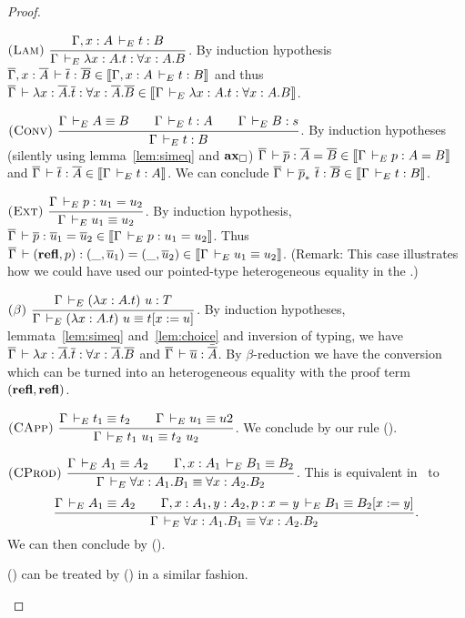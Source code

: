 \documentclass[11pt]{article}
\theoremstyle{plain}
\theoremstyle{remark}
\begin{document}
\begin{proof}
\begin{caselist}
    \nextcase \(
      \nmru{Lam%
          }{\Gamma, x:A \dere t : B
          }{\Gamma \dere \lambda x:A.t : \forall x:A.B}
    \).
    By induction hypothesis
    $\overline{\Gamma}, x:\overline{A} \,\vdash \overline{t} : \overline{B} \in
    \mathopen{{[\kern-0.14em[}} \Gamma, x:A \,\vdash_E t : B \mathclose{{]\kern-0.14em]}}$ and thus
    $\overline{\Gamma} \,\vdash \lambda x:\overline{A}.\overline{t} : \forall x:\overline{A}.\overline{B} \in
    \mathopen{{[\kern-0.14em[}} \Gamma \,\vdash_E \lambda x:A.t : \forall x:A.B \mathclose{{]\kern-0.14em]}}$.

    \nextcase \(
      \nmru{Conv%
          }{\Gamma \dere A \equiv B \qquad
            \Gamma \dere t : A \qquad
            \Gamma \dere B : s
          }{\Gamma \dere t : B}
    \).
    By induction hypotheses (silently using lemma~\ref{lem:simeq} and $\operatorname{\mathbf{ax}_\square}$)
    $\overline{\Gamma} \,\vdash \overline{p} : \overline{A} = \overline{B} \in \mathopen{{[\kern-0.14em[}} \Gamma \,\vdash_E p : A = B \mathclose{{]\kern-0.14em]}}$
    and $\overline{\Gamma} \,\vdash \overline{t} : \overline{A} \in \mathopen{{[\kern-0.14em[}} \Gamma \,\vdash_E t : A \mathclose{{]\kern-0.14em]}}$.
    We can conclude $\overline{\Gamma} \,\vdash \overline{p}_*\ \overline{t} : \overline{B} \in
    \mathopen{{[\kern-0.14em[}} \Gamma \,\vdash_E t : B \mathclose{{]\kern-0.14em]}}$.

    \nextcase \(
      \nmru{Ext%
          }{\Gamma \dere p : u_1 = u_2
          }{\Gamma \dere u_1 \equiv u_2}
    \).
    By induction hypothesis,
    $\overline{\Gamma} \,\vdash \overline{p} : \overline{u}_1 = \overline{u}_2 \in \mathopen{{[\kern-0.14em[}} \Gamma \,\vdash_E p : u_1 = u_2 \mathclose{{]\kern-0.14em]}}$.
    Thus $\overline{\Gamma} \,\vdash (\operatorname{\mathbf{refl}},p) : (\_,\overline{u}_1) = (\_,\overline{u}_2) \in
    \mathopen{{[\kern-0.14em[}} \Gamma \,\vdash_E u_1 \equiv u_2 \mathclose{{]\kern-0.14em]}}$.
    (Remark: This case illustrates how we could have used our pointed-type
    heterogeneous equality in the \CCe.)

    \nextcase \(
      \nmru{$\beta$%
          }{\Gamma \dere (\lambda x:A. t)\ u : T
          }{\Gamma \dere (\lambda x:A. t)\ u \equiv t[x := u]}
    \).
    By induction hypotheses, lemmata~\ref{lem:simeq} and~\ref{lem:choice} and
    inversion of typing, we have
    $\overline{\Gamma} \,\vdash \lambda x:\overline{A}.\overline{t} : \forall x:\overline{A}.\overline{B}$ and
    $\overline{\Gamma} \,\vdash \overline{u} : \bar {\overline{A}}$.
    By $\beta$-reduction we have the conversion which can be turned into
    an heterogeneous equality with the proof term $(\operatorname{\mathbf{refl}},\operatorname{\mathbf{refl}})$.

    \nextcase \(
      \nmru{CApp%
          }{\Gamma \dere t_1 \equiv t_2 \qquad
            \Gamma \dere u_1 \equiv u2
          }{\Gamma \dere t_1\ u_1 \equiv t_2\ u_2}
    \).
    We conclude by our rule ().

    \nextcase \(
      \nmru{CProd%
          }{\Gamma \dere A_1 \equiv A_2 \qquad
            \Gamma, x:A_1 \dere B_1 \equiv B_2
          }{\Gamma \dere \forall x:A_1.B_1 \equiv \forall x:A_2.B_2}
    \).
    This is equivalent in \CCe\ to
    \[
      \ru{\Gamma \dere A_1 \equiv A_2 \qquad
          \Gamma, x:A_1, y:A_2, p : x = y \dere B_1 \equiv B_2[x := y]
        }{\Gamma \dere \forall x:A_1.B_1 \equiv \forall x:A_2.B_2}.
    \]
    We can then conclude by ().

    \nextcase () can be treated by () in a similar
    fashion.
  \end{caselist}
\end{proof}
\end{document}
